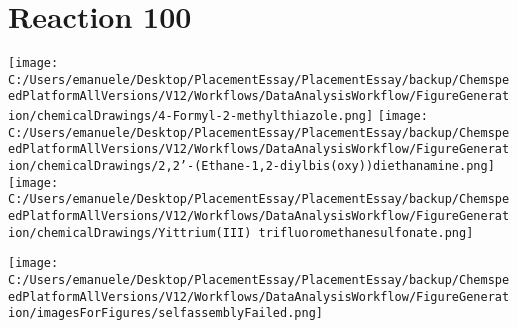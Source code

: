 \documentclass{article}%
\begin{document}
\section*{Reaction 100}%
%
\begin{scheme}[H]%
\begin{minipage}{0.5\textwidth}%
\texttt{[image: C:/Users/emanuele/Desktop/PlacementEssay/PlacementEssay/backup/ChemspeedPlatformAllVersions/V12/Workflows/DataAnalysisWorkflow/FigureGeneration/chemicalDrawings/4-Formyl-2-methylthiazole.png]}%
\texttt{[image: C:/Users/emanuele/Desktop/PlacementEssay/PlacementEssay/backup/ChemspeedPlatformAllVersions/V12/Workflows/DataAnalysisWorkflow/FigureGeneration/chemicalDrawings/2,2'-(Ethane-1,2-diylbis(oxy))diethanamine.png]}%
\texttt{[image: C:/Users/emanuele/Desktop/PlacementEssay/PlacementEssay/backup/ChemspeedPlatformAllVersions/V12/Workflows/DataAnalysisWorkflow/FigureGeneration/chemicalDrawings/Yittrium(III) trifluoromethanesulfonate.png]}%
\end{minipage}%
\begin{minipage}{0.5\textwidth}%
\begin{center}%
\texttt{[image: C:/Users/emanuele/Desktop/PlacementEssay/PlacementEssay/backup/ChemspeedPlatformAllVersions/V12/Workflows/DataAnalysisWorkflow/FigureGeneration/imagesForFigures/selfassemblyFailed.png]}%
\end{center}%
\end{minipage}%
\caption{Self-assembly of components 1, 19, with Yittrium(III) in a 3.0:1.5:1.0 molar ratio in CH$_3$CN at 60\textdegree C for 40h. These are the reagents (starting materials) for reaction 100.}%
\end{scheme}%
\end{document}
